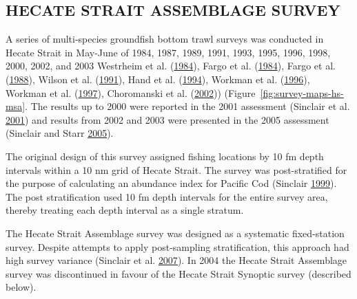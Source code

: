 \documentclass[11pt]{book}
\begin{document}
\clearpage

\Appendices


\clearpage

\label{app:survey-appendix}

\hypertarget{canadian-surveys}{%
\label{canadian-surveys}}

\hypertarget{hecate-strait-assemblage-survey}{%
\subsection{HECATE STRAIT ASSEMBLAGE SURVEY}\label{hecate-strait-assemblage-survey}}

A series of multi-species groundfish bottom trawl surveys was conducted in Hecate Strait in May-June of 1984, 1987, 1989, 1991, 1993, 1995, 1996, 1998, 2000, 2002, and 2003 Westrheim et al. (\protect\hyperlink{ref-westrheim1984}{1984}), Fargo et al. (\protect\hyperlink{ref-fargo1984}{1984}), Fargo et al. (\protect\hyperlink{ref-fargo1988}{1988}), Wilson et al. (\protect\hyperlink{ref-wilson1991}{1991}), Hand et al. (\protect\hyperlink{ref-hand1994}{1994}), Workman et al. (\protect\hyperlink{ref-workman1996}{1996}), Workman et al. (\protect\hyperlink{ref-workman1997}{1997}), Choromanski et al. (\protect\hyperlink{ref-choromanski2002}{2002})) (Figure~\ref{fig:survey-maps-hs-msa}. The results up to 2000 were reported in the 2001 assessment (Sinclair et al. \protect\hyperlink{ref-sinclair2001}{2001}) and results from 2002 and 2003 were presented in the 2005 assessment (Sinclair and Starr \protect\hyperlink{ref-sinclair2005}{2005}).

The original design of this survey assigned fishing locations by 10 fm depth intervals within a 10 nm grid of Hecate Strait. The survey was post-stratified for the purpose of calculating an abundance index for Pacific Cod (Sinclair \protect\hyperlink{ref-sinclair2000}{1999}). The post stratification used 10 fm depth intervals for the entire survey area, thereby treating each depth interval as a single stratum.

The Hecate Strait Assemblage survey was designed as a systematic fixed-station survey. Despite attempts to apply post-sampling stratification, this approach had high survey variance (Sinclair et al. \protect\hyperlink{ref-sinclair2007}{2007}). In 2004 the Hecate Strait Assemblage survey was discontinued in favour of the Hecate Strait Synoptic survey (described below).
\end{document}
